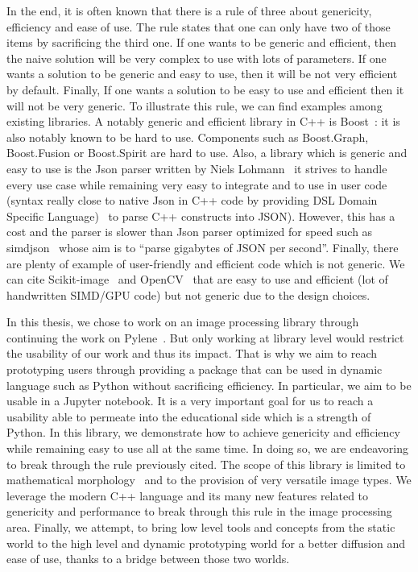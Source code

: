In the end, it is often known that there is a rule of three about genericity, efficiency and ease of use. The rule
states that one can only have two of those items by sacrificing the third one. If one wants to be generic and efficient,
then the naive solution will be very complex to use with lots of parameters. If one wants a solution to be generic and
easy to use, then it will be not very efficient by default. Finally, If one wants a solution to be easy to use and
efficient then it will not be very generic. To illustrate this rule, we can find examples among existing libraries. A
notably generic and efficient library in C++ is Boost~\parencite{boost.2021}: it is also notably known to be hard to
use. Components such as Boost.Graph, Boost.Fusion or Boost.Spirit are hard to use. Also, a library which is generic and
easy to use is the Json parser written by Niels Lohmann~\parencite{nlohmann.2021.json} it strives to handle every use
case while remaining very easy to integrate and to use in user code (syntax really close to native Json in C++ code by
providing DSL Domain Specific Language)~\parencite{deursen.2000.DSL} to parse C++ constructs into JSON). However, this
has a cost and the parser is slower than Json parser optimized for speed such as
simdjson~\parencite{lemire.2021.simdjson} whose aim is to ``parse gigabytes of JSON per second''. Finally, there are
plenty of example of user-friendly and efficient code which is not generic. We can cite
Scikit-image~\parencite{vanderwalt.2014.skimage} and OpenCV~\parencite{bradski.2000.opencv} that are easy to use and
efficient (lot of handwritten SIMD/GPU code) but not generic due to the design choices.

In this thesis, we chose to work on an image processing library through continuing the work on
Pylene~\parencite{carlinet.2018.pylena}. But only working at library level would restrict the usability of our work and
thus its impact. That is why we aim to reach prototyping users through providing a package that can be used in dynamic
language such as Python without sacrificing efficiency. In particular, we aim to be usable in a Jupyter notebook. It is
a very important goal for us to reach a usability able to permeate into the educational side which is a strength of
Python. In this library, we demonstrate how to achieve genericity and efficiency while remaining easy to use all at the
same time. In doing so, we are endeavoring to break through the rule previously cited. The scope of this library is
limited to mathematical morphology~\parencite{najman.2013.mathematical,geraud.2010.book} and to the provision of very
versatile image types. We leverage the modern C++ language and its many new features related to genericity and
performance to break through this rule in the image processing area. Finally, we attempt, to bring low level tools and
concepts from the static world to the high level and dynamic prototyping world for a better diffusion and ease of use,
thanks to a bridge between those two worlds.


